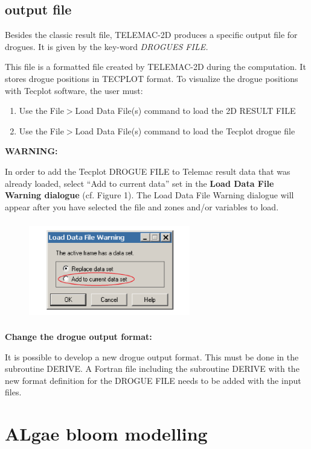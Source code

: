 \subsection{ output file}

 Besides the classic result file, TELEMAC-2D produces a specific output file for drogues. It is given by the key-word \textit{DROGUES FILE. }

 This file is a formatted file created by TELEMAC-2D during the computation. It stores drogue positions in TECPLOT format. To visualize the drogue positions with Tecplot software, the user must:

\begin{enumerate}
\item  Use the File$>$Load Data File(s) command to load the 2D RESULT FILE

\item  Use the File$>$Load Data File(s) command to load the Tecplot drogue file
\end{enumerate}

 \textbf{WARNING:}

 In order to add the Tecplot DROGUE FILE to Telemac result data that was already loaded, select ``Add to current data'' set in the \textbf{Load Data File Warning dialogue} (cf. Figure 1). The Load Data File Warning dialogue will appear after you have selected the file and zones and/or variables to load.
\begin{figure}
\centering
 \includegraphics*[width=2.77in, height=1.70in, keepaspectratio=false]{./graphics/warning1.png}
\label{Load Data File Warning dialogue}
\end{figure}


 \textbf{                    Change the drogue output format:}

 It is possible to develop a new drogue output format. This must be done in the subroutine DERIVE. A Fortran file including the subroutine DERIVE with the new format definition for the DROGUE FILE needs to be added with the input files.


\section{ ALgae bloom modelling}

